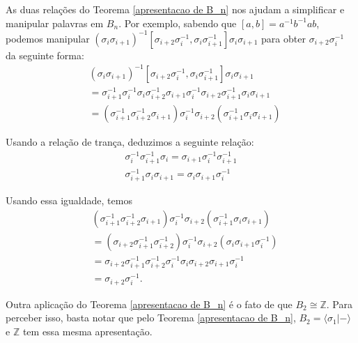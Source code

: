 	\par\vspace{0.3cm} As duas relações do Teorema \eqref{apresentacao de B_n} nos ajudam a simplificar 
	e manipular palavras em $B_n$. Por exemplo, sabendo que $[a,b] = a^{-1}b^{-1}ab$, podemos manipular
	$(\sigma_i\sigma_{i+1})^{-1}[\sigma_{i+2}\sigma_i^{-1}, \sigma_i\sigma_{i+1}^{-1}]\sigma_i\sigma_{i+1}$ 
	para obter $\sigma_{i+2}\sigma_i^{-1}$ da seguinte forma:
	\begin{align*}
	    &(\sigma_i\sigma_{i+1})^{-1}[\sigma_{i+2}\sigma_i^{-1}, \sigma_i\sigma_{i+1}^{-1}]\sigma_i\sigma_{i+1} \\
	    &= \sigma_{i+1}^{-1}\sigma_i^{-1}\sigma_i\sigma_{i+2}^{-1}\sigma_{i+1}\sigma_i^{-1}\sigma_{i+2}
	    \sigma_{i+1}^{-1}\sigma_i\sigma_{i+1}  \\
	    &= (\sigma_{i+1}^{-1}\sigma_{i+2}^{-1}\sigma_{i+1})\sigma_i^{-1}\sigma_{i+2}(\sigma_{i+1}^{-1}
	    \sigma_i\sigma_{i+1})
	\end{align*}
	\par\vspace{0.3cm} Usando a relação de trança, deduzimos a seguinte relação:
	\begin{align*}
	    \sigma_i^{-1}\sigma_{i+1}^{-1}\sigma_i = \sigma_{i+1}\sigma_i^{-1}\sigma_{i+1}^{-1} \\
	    \sigma_{i+1}^{-1}\sigma_i\sigma_{i+1} = \sigma_i\sigma_{i+1}\sigma_i^{-1}   
	\end{align*}
	\par\vspace{0.3cm} Usando essa igualdade, temos
	\begin{align*}
	    &(\sigma_{i+1}^{-1}\sigma_{i+2}^{-1}\sigma_{i+1})\sigma_i^{-1}\sigma_{i+2}(\sigma_{i+1}^{-1}
	    \sigma_i\sigma_{i+1}) \\
	    &= (\sigma_{i+2}\sigma_{i+1}^{-1}\sigma_{i+2}^{-1})\sigma_i^{-1}\sigma_{i+2}(\sigma_i\sigma_{i+1}
	    \sigma_i^{-1}) \\
    	&= \sigma_{i+2}\sigma_{i+1}^{-1}\sigma_{i+2}^{-1}\sigma_i^{-1}\sigma_i\sigma_{i+2}\sigma_{i+1}
    	\sigma_i^{-1} \\
    	&= \sigma_{i+2}\sigma_i^{-1}.
	\end{align*}
	\par\vspace{0.3cm} Outra aplicação do Teorema \eqref{apresentacao de B_n} é o fato de que 
	$B_2\cong\mathbb{Z}$. Para perceber isso, basta notar que pelo Teorema \eqref{apresentacao de B_n}, 
	$B_2 = \langle \sigma_1 | - \rangle$ e $\mathbb{Z}$ tem essa mesma apresentação. 
	
